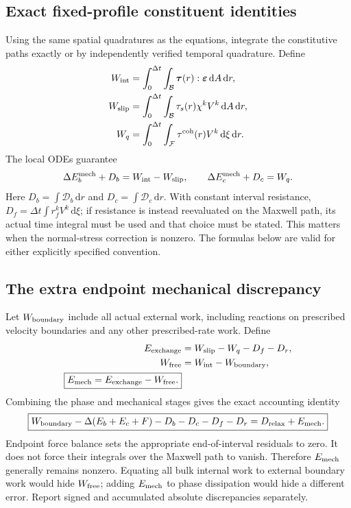 \documentclass[11pt,a4paper]{article}
\newcommand{\B}{\mathcal B}
\newcommand{\F}{\mathcal F}
\newcommand{\strain}{\bm\varepsilon}
\newcommand{\tauv}{\bm\tau}
\newcommand{\qcoh}{\tau^{\rm coh}}
\newcommand{\dd}{\,\mathrm d}
\newcommand{\Dcal}{\mathscr D}
\begin{document}
\subsection{Exact fixed-profile constituent identities}

Using the same spatial quadratures as the equations, integrate the constitutive
paths exactly or by independently verified temporal quadrature. Define
\begin{align}
 W_{\rm int}&=\int_0^{\Delta t}\int_\B\tauv(r):\strain\dd A\dd r,\\
 W_{\rm slip}&=\int_0^{\Delta t}\int_\B\tau_s(r)\chi^k V^k\dd A\dd r,\\
 W_q&=\int_0^{\Delta t}\int_\F\qcoh(r)V^k\dd\xi\dd r.
\end{align}
The local ODEs guarantee
\begin{equation}
 \Delta E_b^{\rm mech}+D_b=W_{\rm int}-W_{\rm slip},\qquad
 \Delta E_c^{\rm mech}+D_c=W_q.
 \label{eq:constituent-ledgers}
\end{equation}
Here $D_b=\int\Dcal_b\dd r$ and $D_c=\int\Dcal_c\dd r$.
With constant interval resistance, $D_f=\Delta t\int r_f^k V^k\dd\xi$;
if resistance is instead reevaluated on the Maxwell path, its actual time
integral must be used and that choice must be stated. This matters when the
normal-stress correction is nonzero. The formulas below are valid for either
explicitly specified convention.

\subsection{The extra endpoint mechanical discrepancy}

Let $W_{\rm boundary}$ include all actual external work, including reactions
on prescribed velocity boundaries and any other prescribed-rate work.
Define
\begin{align}
 E_{\rm exchange}&=W_{\rm slip}-W_q-D_f-D_r,\\
 W_{\rm free}&=W_{\rm int}-W_{\rm boundary},\\
 \boxed{E_{\rm mech}=E_{\rm exchange}-W_{\rm free}.}
 \label{eq:mechanical-error}
\end{align}
Combining the phase and mechanical stages gives the exact accounting identity
\begin{equation}
 \boxed{W_{\rm boundary}
  -\Delta(E_b+E_c+F)-D_b-D_c-D_f-D_r
  =D_{\rm relax}+E_{\rm mech}.}
 \label{eq:full-ledger}
\end{equation}
Endpoint force balance sets the appropriate end-of-interval residuals to zero.
It does not force their integrals over the Maxwell path to vanish. Therefore
$E_{\rm mech}$ generally remains nonzero. Equating all bulk internal work to
external boundary work would hide $W_{\rm free}$; adding $E_{\rm mech}$ to
phase dissipation would hide a different error. Report signed and accumulated
absolute discrepancies separately.
\end{document}
